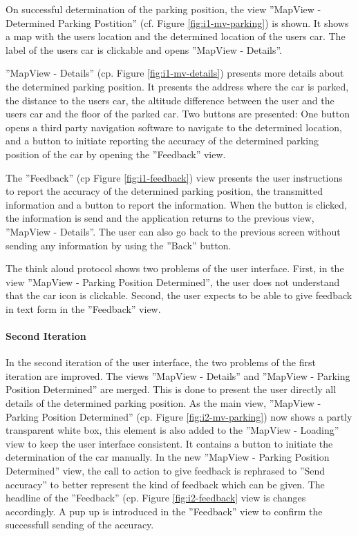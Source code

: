 On successful determination of the parking position, the view ''MapView - Determined Parking Postition'' (cf. Figure \ref{fig:i1-mv-parking}) is shown. It shows a map with the users location and the determined location of the users car. The label of the users car is clickable and opens ''MapView - Details''. 

''MapView - Details'' (cp. Figure \ref{fig:i1-mv-details}) presents more details about the determined parking position. It presents the address where the car is parked, the distance to the users car, the altitude difference between the user and the users car and the floor of the parked car. Two buttons are presented: One button opens a third party navigation software to navigate to the determined location, and a button to initiate reporting the accuracy of the determined parking position of the car by opening the ''Feedback'' view.

The ''Feedback'' (cp Figure \ref{fig:i1-feedback}) view presents the user instructions to report the accuracy of the determined parking position, the transmitted information and a button to report the information. When the button is clicked, the information is send and the application returns to the previous view, ''MapView - Details''. The user can also go back to the previous screen without sending any information by using the ''Back'' button.


The think aloud protocol shows two problems of the user interface. First, in the view ''MapView - Parking Position Determined'', the user does not understand that the car icon is clickable. Second, the user expects to be able to give feedback in text form in the ''Feedback'' view.

\paragraph{Second Iteration}

In the second iteration of the user interface, the two problems of the first iteration are improved. The views ''MapView - Details'' and ''MapView - Parking Position Determined'' are merged. This is done to present the user directly all details of the determined parking position. 
As the main view, ''MapView - Parking Position Determined'' (cp. Figure \ref{fig:i2-mv-parking}) now shows a partly transparent white box, this element is also added to the ''MapView - Loading'' view to keep the user interface consistent. It contains a button to initiate the determination of the car manually. 
In the new ''MapView - Parking Position Determined'' view, the call to action to give feedback is rephrased to ''Send accuracy'' to better represent the kind of feedback which can be given. The headline of the ''Feedback'' (cp. Figure \ref{fig:i2-feedback} view is changes accordingly. A pup up is introduced in the ''Feedback'' view to confirm the successfull sending of the accuracy.

